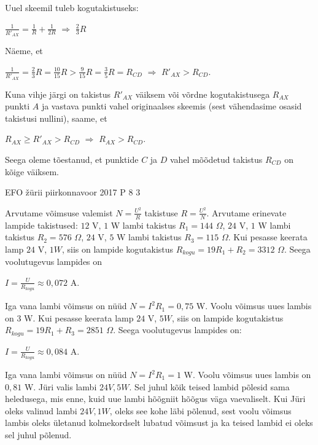 \documentclass[11pt]{article}
\begin{document}
{{\begin{center}
\end{center}
Uuel skeemil tuleb kogutakistuseks:
\begin{center}
$\frac{1}{R'_{AX}} = \frac{1}{R} + \frac{1}{2R}$  $\Rightarrow$ $\frac{2}{3} R$
\end{center}
Näeme, et
\begin{center}
$\frac{1}{R'_{AX}} = \frac{2}{3} R =\frac{10}{15} R > \frac{9}{15}R = \frac{3}{5}R = R_{CD}$ $\Rightarrow$ $R'_{AX} > R_{CD}$.
\end{center}
Kuna vihje järgi on takistus $R'_{AX}$ väiksem või võrdne kogutakistusega $R_{AX}$ punkti $A$ ja vastava punkti vahel originaalses skeemis (sest vähendasime osasid takistusi nullini), saame, et 
\begin{center}
$R_{AX} \geq R'_{AX} > R_{CD}$ $\Rightarrow$ $R_{AX} > R_{CD}$.
\end{center}
Seega oleme tõestanud, et punktide $C$ ja $D$ vahel mõõdetud takistus $R_{CD}$ on kõige väiksem.
\fi
}

{EFO žürii} %
{piirkonnavoor} %
{2017} %
{P 8} %
{3} %
{

\ifSolution
Arvutame võimsuse valemist $N = \frac{U^2}{R}$ takistuse $R = \frac{U^2}{N}$.
Arvutame erinevate lampide takistused:
\newline
$12$ V, $1$ W lambi takistus $R_1 = 144$ $\Omega$,
\newline
$24$ V, $1$ W lambi takistus $R_2 = 576$ $\Omega$,
\newline
$24$ V, $5$ W lambi takistus $R_3 = 115$ $\Omega$.
\newline
Kui pesasse keerata lamp $24$ V, $1 W$, siis on lampide kogutakistus $R_{kogu} = 19 R_1 + R_2 = 3312$ $\Omega$. Seega voolutugevus lampides on 
\begin{center}
$I = \frac{U}{R_{kogu}} \approx 0,072$ A.
\end{center}
Iga vana lambi võimsus on nüüd $N = I^2 R_1 = 0,75$ W.
Voolu võimsus uues lambis on $3$ W.
Kui pesasse keerata lamp $24$ V, $5 W$, siis on lampide kogutakistus $R_{kogu} = 19 R_1 + R_3 = 2851$ $\Omega$. Seega voolutugevus lampides on:
\begin{center}
$I = \frac{U}{R_{kogu}} \approx 0,084$ A.
\end{center}
Iga vana lambi võimsus on nüüd $N = I^2 R_1 = 1$ W.
Voolu võimsus uues lambis on $0,81$ W.
Jüri valis lambi $24V, 5W$. Sel juhul kõik teised lambid põlesid sama heledusega, mis enne, kuid uue lambi hõõgniit hõõgus väga vaevaliselt. Kui Jüri oleks valinud lambi  $24V, 1W$, oleks see kohe läbi põlenud, sest voolu võimsus lambis oleks ületanud kolmekordselt lubatud võimsust ja ka teised lambid ei oleks sel juhul põlenud.
\fi
}

}
\end{document}
